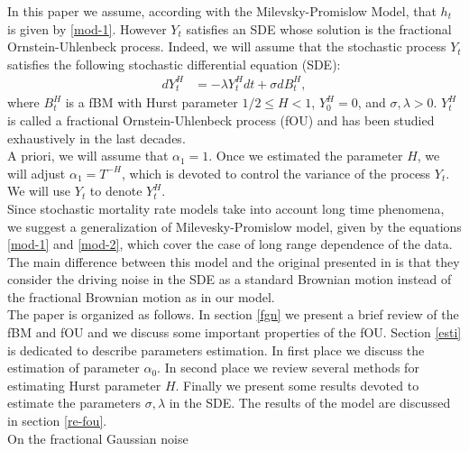 \documentclass[12pt,reqno]{amsart}
\makeatletter
\def\section{\@startsection{section}{1}%
     \z@{.7\linespacing\@plus\linespacing}{.5\linespacing}%
     {\bfseries
     \centering
     }}
\theoremstyle{definition}
\theoremstyle{remark}
\numberwithin{equation}{section}
\makeatother
\begin{document}
In this paper we assume, according with the Milevsky-Promislow Model, that $h_t$ is given by
\eqref{mod-1}. However $Y_t$ satisfies an SDE whose solution is the fractional Ornstein-Uhlenbeck process. Indeed,
we will assume that the stochastic process $Y_t$ satisfies the following stochastic differential
equation (SDE):
\begin{align}
 dY_t^H&=-\lambda Y_t^Hdt+\sigma dB_t^H,  \label{mod-2}
\end{align}
where $B_t^H $ is a fBM with Hurst parameter $1/2 \le H< 1$, $Y_0^H=0$, and $\sigma,\lambda> 0$.
$Y_t^H$ is called a fractional Ornstein-Uhlenbeck process (fOU) and has been studied exhaustively
in the last decades. \\


A priori, we will assume that $\alpha_1=1$. Once we estimated the parameter $H$, we will
adjust $\alpha_1=T^{-H}$, which is devoted to control the variance of the process $Y_t$.
We will use $Y_t$ to denote $Y_t^H$.\\

Since stochastic mortality rate models take into account long time phenomena, we
suggest a generalization of Milevesky-Promislow model, given by the equations
\eqref{mod-1} and \eqref{mod-2}, which cover the case of long range dependence of
the data.\\

The main difference between this model and the original presented
in \cite{mi-pr} is that they consider the driving noise in the SDE as a standard
Brownian motion instead of the fractional Brownian motion as in our model.\\



The paper is organized as follows. In section \ref{fgn} we present a brief review of
the fBM and fOU and we discuss some important properties of the fOU. Section \ref{esti}
is dedicated to describe parameters estimation.
In first place we discuss the estimation of parameter $\alpha_0$. In second place we review several
methods for estimating  Hurst parameter
$H$. Finally we present some results devoted to estimate the parameters
$\sigma,\lambda$ in the SDE. The results of the
model are discussed in section \ref{re-fou}.\\


\section{On the fractional Gaussian noise}
\label{fgn}
\end{document}
